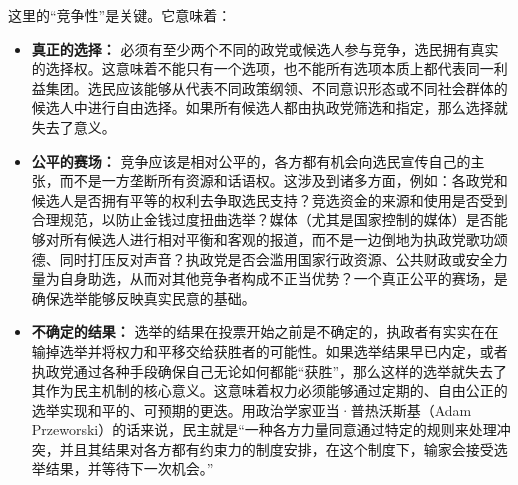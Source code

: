 \documentclass[UTF8, 10pt]{ctexbook}
\begin{document}
这里的“竞争性”是关键。它意味着：
\begin{itemize}
    \item \textbf{真正的选择：} 必须有至少两个不同的政党或候选人参与竞争，选民拥有真实的选择权。这意味着不能只有一个选项，也不能所有选项本质上都代表同一利益集团。选民应该能够从代表不同政策纲领、不同意识形态或不同社会群体的候选人中进行自由选择。如果所有候选人都由执政党筛选和指定，那么选择就失去了意义。
    \item \textbf{公平的赛场：} 竞争应该是相对公平的，各方都有机会向选民宣传自己的主张，而不是一方垄断所有资源和话语权。这涉及到诸多方面，例如：各政党和候选人是否拥有平等的权利去争取选民支持？竞选资金的来源和使用是否受到合理规范，以防止金钱过度扭曲选举？媒体（尤其是国家控制的媒体）是否能够对所有候选人进行相对平衡和客观的报道，而不是一边倒地为执政党歌功颂德、同时打压反对声音？执政党是否会滥用国家行政资源、公共财政或安全力量为自身助选，从而对其他竞争者构成不正当优势？一个真正公平的赛场，是确保选举能够反映真实民意的基础。
    \item \textbf{不确定的结果：} 选举的结果在投票开始之前是不确定的，执政者有实实在在输掉选举并将权力和平移交给获胜者的可能性。如果选举结果早已内定，或者执政党通过各种手段确保自己无论如何都能“获胜”，那么这样的选举就失去了其作为民主机制的核心意义。这意味着权力必须能够通过定期的、自由公正的选举实现和平的、可预期的更迭。用政治学家亚当·普热沃斯基（Adam Przeworski）的话来说，民主就是“一种各方力量同意通过特定的规则来处理冲突，并且其结果对各方都有约束力的制度安排，在这个制度下，输家会接受选举结果，并等待下一次机会。”
\end{itemize}
\end{document}
